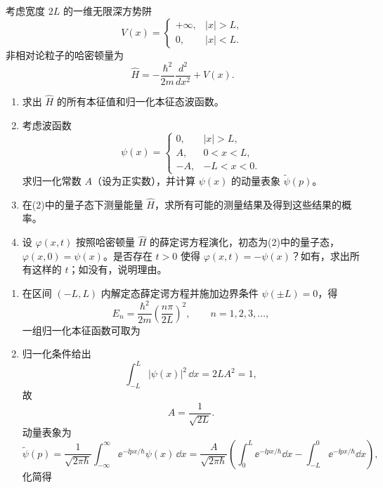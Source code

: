 ﻿


\begin{question}
考虑宽度 $2L$ 的一维无限深方势阱
\[
V(x)=
\begin{cases}
+\infty,& |x|>L,\\
0,& |x|<L.
\end{cases}
\]
非相对论粒子的哈密顿量为
\[
\hat H=-\frac{\hbar^2}{2m}\frac{d^2}{dx^2}+V(x).
\]

\begin{enumerate}[label=(\arabic*),leftmargin=2.5em]
  \item 求出 $\hat H$ 的所有本征值和归一化本征态波函数。
  \item 考虑波函数
  \[
  \psi(x)=
  \begin{cases}
  0,& |x|>L,\\
  A,& 0<x<L,\\
  -A,& -L<x<0.
  \end{cases}
  \]
  求归一化常数 $A$（设为正实数），并计算 $\psi(x)$ 的动量表象 $\tilde\psi(p)$。
  \item 在(2)中的量子态下测量能量 $\hat H$，求所有可能的测量结果及得到这些结果的概率。
  \item 设 $\varphi(x,t)$ 按照哈密顿量 $\hat H$ 的薛定谔方程演化，初态为(2)中的量子态，$\varphi(x,0)=\psi(x)$。是否存在 $t>0$ 使得 $\varphi(x,t)=-\psi(x)$？如有，求出所有这样的 $t$；如没有，说明理由。
\end{enumerate}

\begin{solution}
\begin{enumerate}[label=(\arabic*),leftmargin=2.5em]
  \item 在区间 $(-L,L)$ 内解定态薛定谔方程并施加边界条件 $\psi(\pm L)=0$，得
  \[
  E_n=\frac{\hbar^2}{2m}\left(\frac{n\pi}{2L}\right)^2,
  \qquad n=1,2,3,\dots,
  \]
  一组归一化本征函数可取为

  \item 归一化条件给出
  \[
  \int_{-L}^L |\psi(x)|^2\,\dd{x}=2L A^2=1,
  \]
  故
  \[
  A=\frac{1}{\sqrt{2L}}.
  \]
  动量表象为
  \[
  \tilde\psi(p)=\frac{1}{\sqrt{2\pi\hbar}}\int_{-\infty}^{\infty}\ee^{-\ii px/\hbar}\psi(x)\,\dd{x}
  =\frac{A}{\sqrt{2\pi\hbar}}\left(\int_0^L \ee^{-\ii px/\hbar}\dd{x}-\int_{-L}^0 \ee^{-\ii px/\hbar}\dd{x}\right),
  \]
  化简得


\end{enumerate}
\end{solution}
\end{question}
